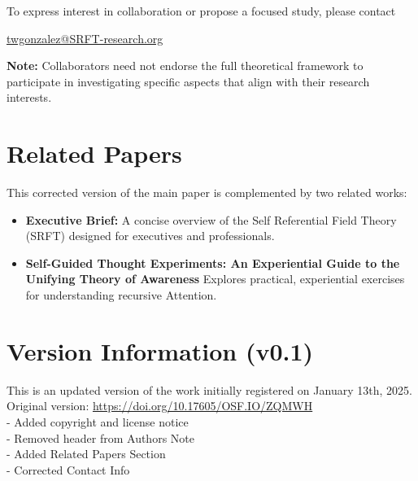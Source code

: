\documentclass[12pt,a4paper]{article}
\begin{document}
To express interest in collaboration or propose a focused study, please contact 

\href{mailto:twgonzalez@SRFT-research.org}{twgonzalez@SRFT-research.org}

\medskip
\noindent
\textbf{Note:} Collaborators need not endorse the full theoretical framework to participate in investigating specific aspects that align with their research interests.

\section{Related Papers}
This corrected version of the main paper is complemented by two related works:
\begin{itemize}
   \item \textbf{Executive Brief:} A concise overview of the Self Referential Field Theory (SRFT) designed for executives and professionals. 
    \item \textbf{Self-Guided Thought Experiments: An
Experiential Guide to the Unifying Theory
of Awareness} Explores practical, experiential exercises for understanding recursive Attention. 
\end{itemize}



\section*{Version Information (v0.1)}
This is an updated version of the work initially registered on January 13th, 2025. Original version: \href{https://doi.org/10.17605/OSF.IO/ZQMWH}{https://doi.org/10.17605/OSF.IO/ZQMWH} \\

\noindent
- Added copyright and license notice \\
- Removed header from Authors Note \\
- Added Related Papers Section \\
- Corrected Contact Info \\

\newpage
\end{document}

